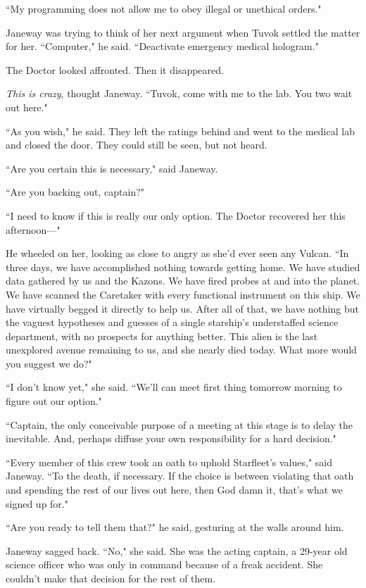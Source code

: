 \documentclass[twoside,letterpaper,12pt]{memoir}
\begin{document}
``My programming does not allow me to obey illegal or unethical orders." 

Janeway was trying to think of her next argument when Tuvok settled the matter for her. ``Computer," he said. ``Deactivate emergency medical hologram." 

The Doctor looked affronted. Then it disappeared. 

\textit{This is crazy}, thought Janeway. ``Tuvok, come with me to the lab. You two wait out here." 

``As you wish," he said. They left the ratings behind and went to the medical lab and closed the door. They could still be seen, but not heard. 

``Are you certain this is necessary," said Janeway. 

``Are you backing out, captain?" 

``I need to know if this is really our only option. The Doctor recovered her this afternoon---" 

He wheeled on her, looking as close to angry as she'd ever seen any Vulcan. ``In three days, we have accomplished nothing towards getting home. We have studied data gathered by us and the Kazons. We have fired probes at and into the planet. We have scanned the Caretaker with every functional instrument on this ship. We have virtually begged it directly to help us. After all of that, we have nothing but the vaguest hypotheses and guesses of a single starship's understaffed science department, with no prospects for anything better. This alien is the last unexplored avenue remaining to us, and she nearly died today. What more would you suggest we do?" 

``I don't know yet," she said. ``We'll can meet first thing tomorrow morning to figure out our option." 

``Captain, the only conceivable purpose of a meeting at this stage is to delay the inevitable. And, perhaps diffuse your own responsibility for a hard decision." 

``Every member of this crew took an oath to uphold Starfleet's values," said Janeway. ``To the death, if necessary. If the choice is between violating that oath and spending the rest of our lives out here, then God damn it, that's what we signed up for." 

``Are you ready to tell them that?" he said, gesturing at the walls around him. 

Janeway sagged back. ``No," she said. She was the acting captain, a 29-year old science officer who was only in command because of a freak accident. She couldn't make that decision for the rest of them. 
\end{document}
